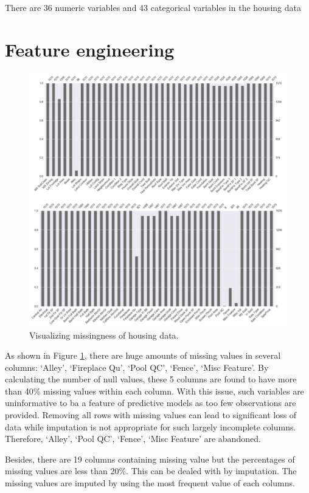 \documentclass[letterpaper,12pt,twoside,]{pinp}
\begin{document}
There are 36 numeric variables and 43 categorical variables in the
housing data

\hypertarget{feature-engineering}{%
\section{Feature engineering}\label{feature-engineering}}

\begin{figure}
\includegraphics[width=1\linewidth]{miss_plot.png}
\centering
\caption{Visualizing missingness of housing data.}
\label{fig:miss}
\end{figure}

As shown in Figure \ref{fig:miss}, there are huge amounts of missing
values in several columns: `Alley', `Fireplace Qu', `Pool QC', `Fence',
`Misc Feature'. By calculating the number of null values, these 5
columns are found to have more than 40\% missing values within each
column. With this issue, such variables are uninformative to ba a
feature of predictive models as too few observations are provided.
Removing all rows with missing values can lead to significant loss of
data while imputation is not appropriate for such largely incomplete
columns. Therefore, `Alley', `Pool QC', `Fence', `Misc Feature' are
abandoned.

Besides, there are 19 columns containing missing value but the
percentages of missing values are less than 20\%. This can be dealed
with by imputation. The missing values are imputed by using the most
frequent value of each columns.
\end{document}
